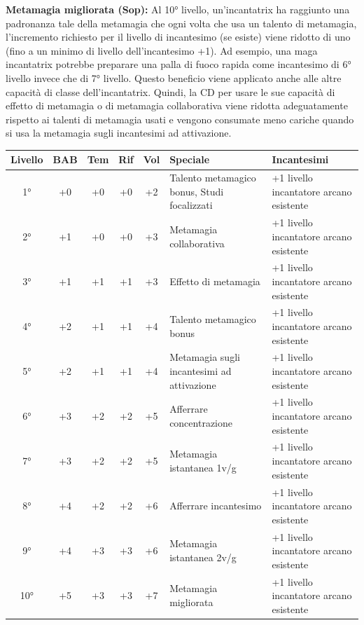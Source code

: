 \documentclass[10pt, a4paper]{report}
\begin{document}
\begin{multicols}{2}
\textbf{Metamagia migliorata (Sop):} Al 10° livello, un'incantatrix ha raggiunto una padronanza tale della metamagia che ogni volta che usa un talento di metamagia, l'incremento richiesto per il livello di incantesimo (se esiste) viene ridotto di uno (fino a un minimo di livello dell'incantesimo +1). Ad esempio, una maga incantatrix potrebbe preparare una palla di fuoco rapida come incantesimo di 6° livello invece che di 7° livello.
Questo beneficio viene applicato anche alle altre capacità di classe dell'incantatrix. Quindi, la CD per usare le sue capacità di effetto di metamagia o di metamagia collaborativa viene ridotta adeguatamente rispetto ai talenti di metamagia usati e vengono consumate meno cariche quando si usa la metamagia sugli incantesimi ad attivazione.\\

\end{multicols}

\hspace{-1.6cm}
{\sffamily
\begin{tabular}{|c|c|c|c|c|l|l|}
	\hline
	\textbf{Livello} & \textbf{BAB} & \textbf{Tem} & \textbf{Rif} & \textbf{Vol} & \textbf{Speciale} & \textbf{Incantesimi} \\
	\hline
	1° & +0  & +0  & +0  & +2 & Talento metamagico bonus, Studi focalizzati & +1 livello incantatore arcano esistente \\
	\hline
	2° & +1  & +0  & +0  & +3 & Metamagia collaborativa                       & +1 livello incantatore arcano esistente \\
	\hline
	3° & +1  & +1  & +1  & +3 & Effetto di metamagia                             & +1 livello incantatore arcano esistente \\
	\hline
	4° & +2  & +1  & +1  & +4 & Talento metamagico bonus                        & +1 livello incantatore arcano esistente \\
	\hline
	5° & +2  & +1  & +1  & +4 & Metamagia sugli incantesimi ad attivazione     & +1 livello incantatore arcano esistente \\
	\hline
	6° & +3  & +2  & +2  & +5 & Afferrare concentrazione                          & +1 livello incantatore arcano esistente \\
	\hline
	7° & +3  & +2  & +2  & +5 & Metamagia istantanea 1v/g 						& +1 livello incantatore arcano esistente \\
	\hline
	8° & +4  & +2  & +2  & +6 & Afferrare incantesimo                                 & +1 livello incantatore arcano esistente \\
	\hline
	9° & +4  & +3  & +3  & +6 & Metamagia istantanea 2v/g                      & +1 livello incantatore arcano esistente \\
	\hline
	10° & +5 & +3  & +3  & +7 & Metamagia migliorata     & +1 livello incantatore arcano esistente \\
	\hline
\end{tabular}
}
\end{document}
